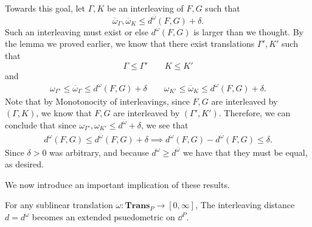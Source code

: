 \begin{prf}
\begin{description}
    Towards this goal, let $\Gamma, K$ 
    be an interleaving of $F, G$ such that 
    \[
        \overline{\omega}_{\Gamma}, \overline{\omega}_{K} \le d^{\overline{\omega}}(F, G) + \delta.
    \]
    Such an interleaving must exist or else $d^{\overline{\omega}}(F, G)$ 
    is larger than we thought. 
    By the lemma we proved earlier, we know that there exist 
    translations $\Gamma', K'$ such that 
    \[
        \Gamma \le \Gamma' \qquad K \le K'
    \]
    and 
    \begin{align*}
        \omega_{\Gamma'} \le \overline{\omega}_{\Gamma} \le d^{\omega}(F, G) + \delta
        \qquad \omega_{K'} \le \overline{\omega}_{K} \le d^{\omega}(F, G) + \delta.
    \end{align*}
    Note that by Monotonocity of interleavings, since $F, G$ are interleaved 
    by $(\Gamma, K)$, we know that $F, G$ are interleaved by 
    $(\Gamma', K')$. Therefore, we can conclude that since $\omega_{\Gamma'}, \omega_{K'} \le d^{\overline{\omega}} + \delta$, we see that 
    \begin{align*}
        d^{\omega}(F, G) \le  d^{\overline{\omega}}(F,G) + \delta \implies d^{\omega}(F, G) - d^{\overline{\omega}}(F,G) \le \delta.
    \end{align*}
    Since $\delta > 0$ was arbitrary, and because $d^{\omega} \ge d^{\overline{\omega}}$ 
    we have that they must be equal, as desired. 
    \end{description}
\end{prf}

We now introduce an important implication of these results. 

\begin{thm}
    For any sublinear translation $\omega: \textbf{Trans}_P \to [0, \infty]$, 
    The interleaving distance $d = d^\omega$ becomes an extended psuedometric
    on $\dd^P$. 
\end{thm}

